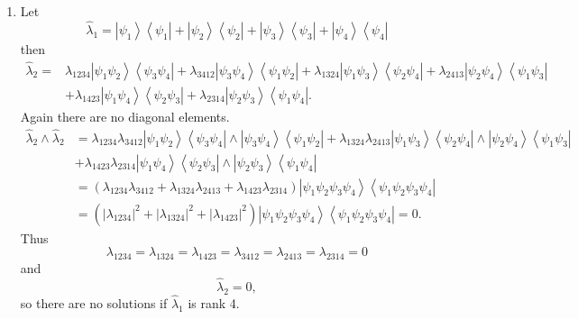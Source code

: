 \documentclass[aps,preprint]{revtex4}%
\begin{document}
\begin{enumerate}
\item Let
\begin{equation}
\hat{\lambda}_{1}=\left\vert \psi_{1}\right\rangle \left\langle \psi
_{1}\right\vert +\left\vert \psi_{2}\right\rangle \left\langle \psi
_{2}\right\vert +\left\vert \psi_{3}\right\rangle \left\langle \psi
_{3}\right\vert +\left\vert \psi_{4}\right\rangle \left\langle \psi
_{4}\right\vert
\end{equation}
then
\begin{align}
\hat{\lambda}_{2}=  &  \lambda_{1234}\left\vert \psi_{1}\psi_{2}\right\rangle
\left\langle \psi_{3}\psi_{4}\right\vert +\lambda_{3412}\left\vert \psi
_{3}\psi_{4}\right\rangle \left\langle \psi_{1}\psi_{2}\right\vert
+\lambda_{1324}\left\vert \psi_{1}\psi_{3}\right\rangle \left\langle \psi
_{2}\psi_{4}\right\vert +\lambda_{2413}\left\vert \psi_{2}\psi_{4}%
\right\rangle \left\langle \psi_{1}\psi_{3}\right\vert \nonumber\\
&  +\lambda_{1423}\left\vert \psi_{1}\psi_{4}\right\rangle \left\langle
\psi_{2}\psi_{3}\right\vert +\lambda_{2314}\left\vert \psi_{2}\psi
_{3}\right\rangle \left\langle \psi_{1}\psi_{4}\right\vert .
\end{align}
Again there are no diagonal elements.
\begin{align}
\hat{\lambda}_{2}\wedge\hat{\lambda}_{2}  &  =\lambda_{1234}\lambda
_{3412}\left\vert \psi_{1}\psi_{2}\right\rangle \left\langle \psi_{3}\psi
_{4}\right\vert \wedge\left\vert \psi_{3}\psi_{4}\right\rangle \left\langle
\psi_{1}\psi_{2}\right\vert +\lambda_{1324}\lambda_{2413}\left\vert \psi
_{1}\psi_{3}\right\rangle \left\langle \psi_{2}\psi_{4}\right\vert
\wedge\left\vert \psi_{2}\psi_{4}\right\rangle \left\langle \psi_{1}\psi
_{3}\right\vert \nonumber\\
&  +\lambda_{1423}\lambda_{2314}\left\vert \psi_{1}\psi_{4}\right\rangle
\left\langle \psi_{2}\psi_{3}\right\vert \wedge\left\vert \psi_{2}\psi
_{3}\right\rangle \left\langle \psi_{1}\psi_{4}\right\vert \nonumber\\
&  =\left(  \lambda_{1234}\lambda_{3412}+\lambda_{1324}\lambda_{2413}%
+\lambda_{1423}\lambda_{2314}\right)  \left\vert \psi_{1}\psi_{2}\psi_{3}%
\psi_{4}\right\rangle \left\langle \psi_{1}\psi_{2}\psi_{3}\psi_{4}\right\vert
\nonumber\\
&  =\left(  \left\vert \lambda_{1234}\right\vert ^{2}+\left\vert
\lambda_{1324}\right\vert ^{2}+\left\vert \lambda_{1423}\right\vert
^{2}\right)  \left\vert \psi_{1}\psi_{2}\psi_{3}\psi_{4}\right\rangle
\left\langle \psi_{1}\psi_{2}\psi_{3}\psi_{4}\right\vert =0.
\end{align}
Thus
\begin{equation}
\lambda_{1234}=\lambda_{1324}=\lambda_{1423}=\lambda_{3412}=\lambda
_{2413}=\lambda_{2314}=0
\end{equation}
and
\begin{equation}
\hat{\lambda}_{2}=0,
\end{equation}
so there are no solutions if $\hat{\lambda}_{1}$ is rank 4.


\end{enumerate}
\end{document}
